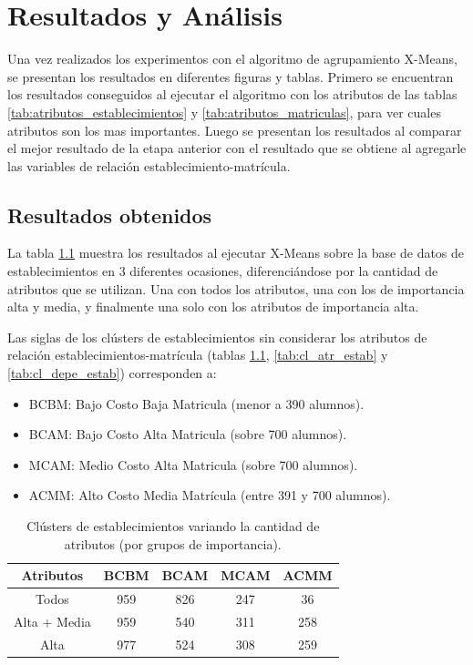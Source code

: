 \chapter{Resultados y Análisis}

Una vez realizados los experimentos con el algoritmo de agrupamiento X-Means, se presentan los resultados en diferentes figuras y tablas. Primero se encuentran los resultados conseguidos al ejecutar el algoritmo con los atributos de las tablas \ref{tab:atributos_establecimientos} y \ref{tab:atributos_matriculas}, para ver cuales atributos son los mas importantes. Luego se presentan los resultados al comparar el mejor resultado de la etapa anterior con el resultado que se obtiene al agregarle las variables de relación establecimiento-matrícula.

\section{Resultados obtenidos}

La tabla \ref{tab:cl_estab} muestra los resultados al ejecutar X-Means sobre la base de datos de establecimientos en 3 diferentes ocasiones, diferenciándose por la cantidad de atributos que se utilizan. Una con todos los atributos, una con los de importancia alta y media, y finalmente una solo con los atributos de importancia alta.

Las siglas de los clústers de establecimientos sin considerar los atributos de relación establecimientos-matrícula (tablas \ref{tab:cl_estab}, \ref{tab:cl_atr_estab} y \ref{tab:cl_depe_estab}) corresponden a:

\begin{itemize}
    \item BCBM: Bajo Costo Baja Matricula (menor a 390 alumnos).
    \item BCAM: Bajo Costo Alta Matricula (sobre 700 alumnos).
    \item MCAM: Medio Costo Alta Matricula (sobre 700 alumnos).
    \item ACMM: Alto Costo Media Matrícula (entre 391 y 700 alumnos).
\end{itemize}

\begin{table}[H]
\centering
\caption{Clústers de establecimientos variando la cantidad de atributos (por grupos de importancia).}
\label{tab:cl_estab}
\begin{tabular}{|c|c|c|c|c|}
\hline
\textbf{Atributos} & \textbf{BCBM} & \textbf{BCAM} & \textbf{MCAM} & \textbf{ACMM}   \\ \hline
Todos & 959 & 826 & 247 & 36 \\ \hline
Alta + Media & 959 & 540 & 311 & 258 \\ \hline
Alta & 977 & 524 & 308 & 259\\ \hline
\end{tabular}
\end{table}

